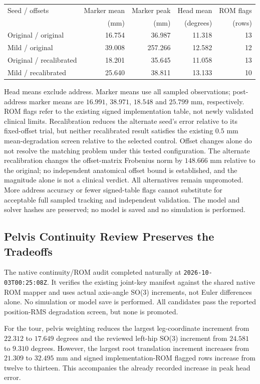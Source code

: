 \documentclass[11pt,a4paper]{article}
\begin{document}
\begin{center}
\begin{tabularx}{\textwidth}{lrrrr}
\toprule
Seed / offsets & Marker mean & Marker peak & Head mean & ROM flags \\
 & (mm) & (mm) & (degrees) & (rows) \\
\midrule
Original / original & 16.754 & 36.987 & 11.318 & 13 \\
Mild / original & 39.008 & 257.266 & 12.582 & 12 \\
Original / recalibrated & 18.201 & 35.645 & 11.058 & 13 \\
Mild / recalibrated & 25.640 & 38.811 & 13.133 & 10 \\
\bottomrule
\end{tabularx}
\end{center}
Head means exclude address. Marker means use all sampled observations;
post-address marker means are $16.991$, $38.971$, $18.548$ and $25.799$ mm,
respectively. ROM flags refer to the existing signed implementation
table, not newly validated clinical limits. Recalibration reduces the
alternate seed's error relative to its fixed-offset trial, but neither
recalibrated result satisfies the existing $0.5$ mm mean-degradation
screen relative to the selected control. Offset changes alone do not
resolve the matching problem under this tested configuration. The
alternate recalibration changes the offset-matrix Frobenius norm by
$148.666$ mm relative to the original; no independent anatomical offset
bound is established, and the magnitude alone is not a clinical verdict.
All alternatives remain unpromoted. More address accuracy or fewer
signed-table flags cannot substitute for acceptable full sampled tracking
and independent validation. The model and solver hashes are preserved;
no model is saved and no simulation is performed.


\subsection{Pelvis Continuity Review Preserves the Tradeoffs}
The native continuity/ROM audit completed naturally at
\texttt{2026-10-03T00:25:08Z}. It verifies the existing joint-key manifest
against the shared native ROM mapper and uses actual axis-angle SO(3)
increments, not Euler differences alone. No simulation or model save is
performed. All candidates pass the reported position-RMS degradation
screen, but none is promoted.

For the tour, pelvis weighting reduces the largest leg-coordinate
increment from $22.312$ to $17.649$ degrees and the reviewed left-hip
SO(3) increment from $24.581$ to $9.310$ degrees. However, the largest
root translation increment increases from $21.309$ to $32.495$ mm and
signed implementation-ROM flagged rows increase from twelve to thirteen.
This accompanies the already recorded increase in peak head error.
\end{document}
